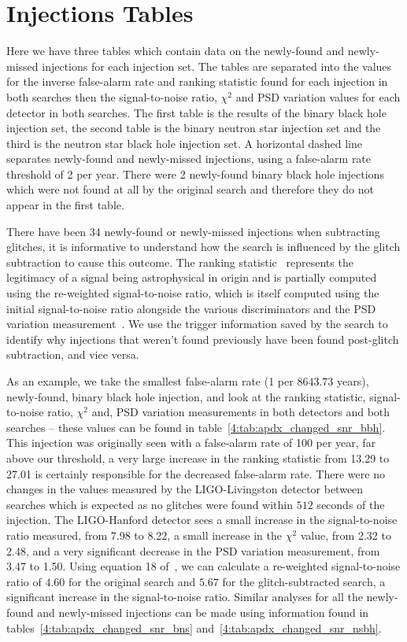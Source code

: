 \section{\label{4:sec:apdx_injections_table}Injections Tables}

Here we have three tables which contain data on the newly-found and newly-missed injections for each injection set. The tables are separated into the values for the inverse false-alarm rate and ranking statistic found for each injection in both searches then the signal-to-noise ratio, $\chi^{2}$ and PSD variation values for each detector in both searches. The first table is the results of the binary black hole injection set, the second table is the binary neutron star injection set and the third is the neutron star black hole injection set. A horizontal dashed line separates newly-found and newly-missed injections, using a false-alarm rate threshold of 2 per year. There were 2 newly-found binary black hole injections which were not found at all by the original search and therefore they do not appear in the first table.

There have been 34 newly-found or newly-missed \gw{} injections when subtracting \scl{} glitches, it is informative to understand how the \gw{} search is influenced by the glitch subtraction to cause this outcome. The ranking statistic~\cite{PyCBC_global:2020} represents the legitimacy of a signal being astrophysical in origin and is partially computed using the re-weighted signal-to-noise ratio, which is itself computed using the initial signal-to-noise ratio alongside the various \gw{} discriminators and the PSD variation measurement~\cite{PSD_var:2020}. We use the trigger information saved by the \gw{} search to identify why injections that weren't found previously have been found post-glitch subtraction, and vice versa. 

As an example, we take the smallest false-alarm rate (1 per $8643.73$ years), newly-found, binary black hole injection, and look at the ranking statistic, signal-to-noise ratio, $\chi^{2}$ and, PSD variation measurements in both detectors and both searches -- these values can be found in table~\ref{4:tab:apdx_changed_snr_bbh}. This injection was originally seen with a false-alarm rate of 100 per year, far above our threshold, a very large increase in the ranking statistic from 13.29 to 27.01 is certainly responsible for the decreased false-alarm rate. There were no changes in the values measured by the LIGO-Livingston detector between searches which is expected as no \scl{} glitches were found within $512$ seconds of the injection. The LIGO-Hanford detector sees a small increase in the signal-to-noise ratio measured, from 7.98 to 8.22, a small increase in the $\chi^{2}$ value, from 2.32 to 2.48, and a very significant decrease in the PSD variation measurement, from 3.47 to 1.50. Using equation 18 of~\cite{PSD_var:2020}, we can calculate a re-weighted signal-to-noise ratio of $4.60$ for the original search and $5.67$ for the glitch-subtracted search, a significant increase in the signal-to-noise ratio. Similar analyses for all the newly-found and newly-missed injections can be made using information found in tables~\ref{4:tab:apdx_changed_snr_bns} and~\ref{4:tab:apdx_changed_snr_nsbh}.

